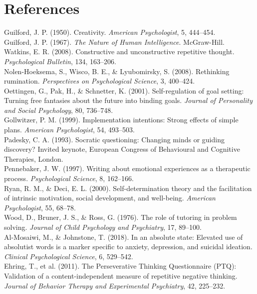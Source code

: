 \documentclass[11pt, a4paper]{article}
\begin{document}
\section*{References}
\noindent [1] Guilford, J. P. (1950). Creativity. \textit{American Psychologist}, 5, 444--454.\\
\noindent [2] Guilford, J. P. (1967). \textit{The Nature of Human Intelligence}. McGraw-Hill.\\
\noindent [3] Watkins, E. R. (2008). Constructive and unconstructive repetitive thought. \textit{Psychological Bulletin}, 134, 163--206.\\
\noindent [4] Nolen-Hoeksema, S., Wisco, B. E., \& Lyubomirsky, S. (2008). Rethinking rumination. \textit{Perspectives on Psychological Science}, 3, 400--424.\\
\noindent [5] Oettingen, G., Pak, H., \& Schnetter, K. (2001). Self-regulation of goal setting: Turning free fantasies about the future into binding goals. \textit{Journal of Personality and Social Psychology}, 80, 736--748.\\
\noindent [6] Gollwitzer, P. M. (1999). Implementation intentions: Strong effects of simple plans. \textit{American Psychologist}, 54, 493--503.\\
\noindent [7] Padesky, C. A. (1993). Socratic questioning: Changing minds or guiding discovery? Invited keynote, European Congress of Behavioural and Cognitive Therapies, London.\\
\noindent [8] Pennebaker, J. W. (1997). Writing about emotional experiences as a therapeutic process. \textit{Psychological Science}, 8, 162--166.\\
\noindent [9] Ryan, R. M., \& Deci, E. L. (2000). Self-determination theory and the facilitation of intrinsic motivation, social development, and well-being. \textit{American Psychologist}, 55, 68--78.\\
\noindent [10] Wood, D., Bruner, J. S., \& Ross, G. (1976). The role of tutoring in problem solving. \textit{Journal of Child Psychology and Psychiatry}, 17, 89--100.\\
\noindent [11] Al-Mosaiwi, M., \& Johnstone, T. (2018). In an absolute state: Elevated use of absolutist words is a marker specific to anxiety, depression, and suicidal ideation. \textit{Clinical Psychological Science}, 6, 529--542.\\
\noindent [12] Ehring, T., et al. (2011). The Perseverative Thinking Questionnaire (PTQ): Validation of a content-independent measure of repetitive negative thinking. \textit{Journal of Behavior Therapy and Experimental Psychiatry}, 42, 225--232.\\
\end{document}
